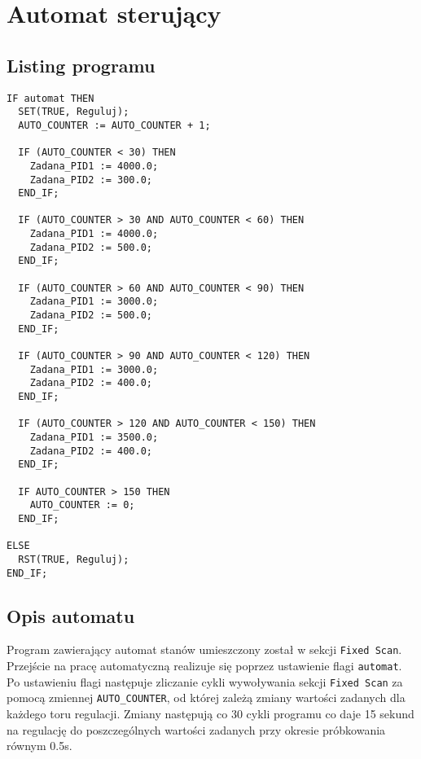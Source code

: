 \chapter{Automat sterujący}
\label{inteco_automat}

\section{Listing programu}
\label{automat_lst}

\begin{lstlisting}
IF automat THEN
  SET(TRUE, Reguluj);
  AUTO_COUNTER := AUTO_COUNTER + 1;

  IF (AUTO_COUNTER < 30) THEN
	Zadana_PID1 := 4000.0;
	Zadana_PID2 := 300.0;	
  END_IF;

  IF (AUTO_COUNTER > 30 AND AUTO_COUNTER < 60) THEN
	Zadana_PID1 := 4000.0;
	Zadana_PID2 := 500.0;
  END_IF;

  IF (AUTO_COUNTER > 60 AND AUTO_COUNTER < 90) THEN
	Zadana_PID1 := 3000.0;
	Zadana_PID2 := 500.0;
  END_IF;

  IF (AUTO_COUNTER > 90 AND AUTO_COUNTER < 120) THEN
  	Zadana_PID1 := 3000.0;
	Zadana_PID2 := 400.0;
  END_IF;
	
  IF (AUTO_COUNTER > 120 AND AUTO_COUNTER < 150) THEN
	Zadana_PID1 := 3500.0;
	Zadana_PID2 := 400.0;
  END_IF;

  IF AUTO_COUNTER > 150 THEN
	AUTO_COUNTER := 0;
  END_IF;

ELSE
  RST(TRUE, Reguluj);
END_IF;

\end{lstlisting}

\section{Opis automatu}
\label{automat_opis}
Program zawierający automat stanów umieszczony został w sekcji \verb+Fixed Scan+. Przejście na pracę automatyczną realizuje się poprzez ustawienie flagi \verb+automat+. Po ustawieniu flagi następuje zliczanie cykli wywoływania sekcji \verb+Fixed Scan+ za pomocą zmiennej \verb+AUTO_COUNTER+, od której zależą zmiany wartości zadanych dla każdego toru regulacji. Zmiany następują co 30 cykli programu co daje 15 sekund na regulację do poszczególnych wartości zadanych przy okresie próbkowania równym \num{0,5}s.